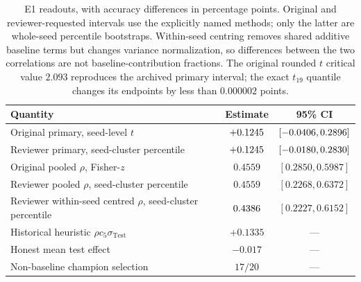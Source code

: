 \documentclass[10pt,letterpaper]{article}
\theoremstyle{remark}
\begin{document}
\begin{table}[tbp]
\centering
\footnotesize
\setlength{\tabcolsep}{5pt}
\begin{tabular}{@{}L{7.3cm}cc@{}}
\toprule
Quantity & Estimate & 95\% CI \\
\midrule
Original primary, seed-level $t$ & $+0.1245$ &
$[-0.0406,0.2896]$ \\
Reviewer primary, seed-cluster percentile & $+0.1245$ &
$[-0.0180,0.2830]$ \\
Original pooled $\rho$, Fisher-$z$ & $0.4559$ &
$[0.2850,0.5987]$ \\
Reviewer pooled $\rho$, seed-cluster percentile & $0.4559$ &
$[0.2268,0.6372]$ \\
Reviewer within-seed centred $\rho$, seed-cluster percentile & $0.4386$ &
$[0.2227,0.6152]$ \\
Historical heuristic $\rho c_5\sigma_{\mathrm{Test}}$ & $+0.1335$ & --- \\
Honest mean test effect & $-0.017$ & --- \\
Non-baseline champion selection & $17/20$ & --- \\
\bottomrule
\end{tabular}
\caption{E1 readouts, with accuracy differences in percentage points.
Original and reviewer-requested intervals use the explicitly named methods;
only the latter are whole-seed percentile bootstraps. Within-seed centring
removes shared additive baseline terms but changes variance normalization,
so differences between the two correlations are not baseline-contribution
fractions. The original rounded $t$ critical value $2.093$ reproduces the
archived primary interval; the exact $t_{19}$ quantile changes its endpoints
by less than $0.000002$ points.}
\label{tab:e1}
\end{table}
\end{document}

